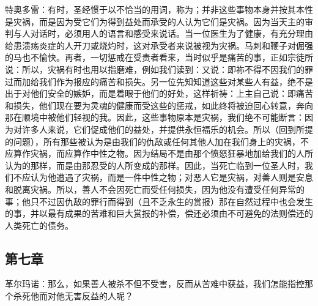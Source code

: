特奥多雷：有时，圣经惯于以不恰当的用词，称为；并非这些事物本身并按其本性是灾祸，而是因为受它们为得到益处而承受的人认为它们是灾祸。因为当天主的审判与人对话时，必须用人的语言和感受来说话。当一位医生为了健康，有充分理由给患溃疡炎症的人开刀或烧灼时，这对承受者来说被视为灾祸。马刺和鞭子对倔强的马也不愉快。再者，一切惩戒在受责者看来，当时似乎是痛苦的事，正如宗徒所说：所以，灾祸有时也用以指磨难，例如我们读到：又说：即祢不得不因我们的罪过而加给我们作为报应的痛苦和损失。另一位先知知道这些对某些人有益，绝不是出于对他们安全的嫉妒，而是着眼于他们的好处，这样祈祷：上主自己说：即痛苦和损失，他们现在要为灵魂的健康而受这些的惩戒，如此终将被迫回心转意，奔向那在顺境中被他们轻视的我。因此，这些事物原本是灾祸，我们绝不可能断言：因为对许多人来说，它们促成他们的益处，并提供永恒福乐的机会。所以（回到所提的问题），所有那些被认为是由我们的仇敌或任何其他人加在我们身上的灾祸，不应算作灾祸，而应算作中性之物。因为结局不是由那个愤怒狂暴地加给我们的人所认为的那样，而是由那忍受的人所变成的那样。因此，当死亡临到一位圣人时，我们不应认为他遭遇了灾祸，而是一件中性之物；对恶人它是灾祸，对善人则是安息和脱离灾祸。所以，善人不会因死亡而受任何损失，因为他没有遭受任何异常的事；他只不过因仇敌的罪行而得到（且不乏永生的赏报）那在自然过程中也会发生的事，并以最有成果的苦难和巨大赏报的补偿，偿还必须由不可避免的法则偿还的人类死亡的债务。\par


\subsection{第七章}

\par

革尔玛诺：那么，如果善人被杀不但不受害，反而从苦难中获益，我们怎能指控那个杀死他而对他无害反益的人呢？\par


